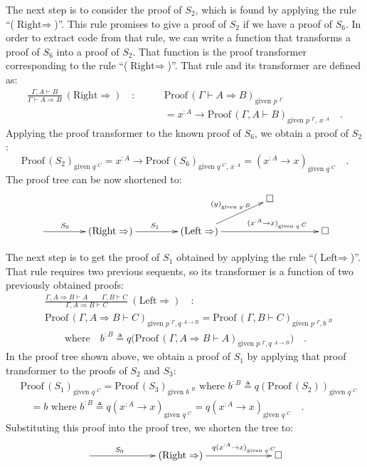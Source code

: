The next step is to consider the proof of $S_{2}$, which is found
by applying the rule \textsf{``}($\text{Right}\Rightarrow$)\textsf{''}. This rule
promises to give a proof of $S_{2}$ if we have a proof of $S_{6}$.
In order to extract code from that rule, we can write a function that
transforms a proof of $S_{6}$ into a proof of $S_{2}$. That function
is the proof transformer corresponding to the rule \textsf{``}($\text{Right}\Rightarrow$)\textsf{''}.
That rule and its transformer are defined as:
\begin{align*}
\frac{\Gamma,A\vdash B}{\Gamma\vdash A\Rightarrow B}~(\text{Right}\Rightarrow)\quad: & \quad\quad\text{Proof}\,(\Gamma\vdash A\Rightarrow B)_{\text{given }p^{:\Gamma}}\\
 & \quad\quad=x^{:A}\rightarrow\text{Proof}\,(\Gamma,A\vdash B)_{\text{given }p^{:\Gamma},\,x^{:A}}\quad.
\end{align*}
Applying the proof transformer to the known proof of $S_{6}$, we
obtain a proof of $S_{2}$:
\[
\text{Proof}\,(S_{2})_{\text{given }q^{:C}}=x^{:A}\rightarrow\text{Proof}\,(S_{6})_{\text{given }q^{:C},\,x^{:A}}=(x^{:A}\rightarrow x)_{\text{given }q^{:C}}\quad.
\]
The proof tree can be now shortened to:
\[
\xymatrix{\xyScaleY{1.5pc}\xyScaleX{3.5pc} &  &  & \square\\
\ar[r]\sp(0.35){S_{0}} & (\text{Right}\Rightarrow)\ar[r]\sp(0.5){S_{1}} & (\text{Left}\Rightarrow)\ar[rr]\sp(0.62){(x^{:A}\rightarrow x)_{\text{given }q^{:C}}}\ar[ru]\sp(0.6){(y)_{\text{given }y^{:B}}} &  & \square
}
\]

The next step is to get the proof of $S_{1}$ obtained by applying
the rule \textsf{``}($\text{Left}\Rightarrow$)\textsf{''}. That rule requires two
previous sequents, so its transformer is a function of two previously
obtained proofs:
\begin{align*}
 & \frac{\Gamma,A\Rightarrow B\vdash A\quad\quad\Gamma,B\vdash C}{\Gamma,A\Rightarrow B\vdash C}~(\text{Left}\Rightarrow)\quad:\\
 & \text{Proof}\,(\Gamma,A\Rightarrow B\vdash C)_{\text{given }p^{:\Gamma},q^{:A\rightarrow B}}=\text{Proof}\,(\Gamma,B\vdash C)_{\text{given }p^{:\Gamma},b^{:B}}\\
 & \quad\quad\text{where}\quad b^{:B}\triangleq q\big(\text{Proof}\,(\Gamma,A\Rightarrow B\vdash A)_{\text{given }p^{:\Gamma},q^{:A\rightarrow B}}\big)\quad.
\end{align*}
In the proof tree shown above, we obtain a proof of $S_{1}$ by applying
that proof transformer to the proofs of $S_{2}$ and $S_{3}$:
\begin{align*}
 & \text{Proof}\,(S_{1})_{\text{given }q^{:C}}=\text{Proof}\,(S_{3})_{\text{given }b^{:B}}\text{ where }b^{:B}\triangleq q(\text{Proof}\,(S_{2}))_{\text{given }q^{:C}}\\
 & \quad=b\text{ where }b^{:B}\triangleq q(x^{:A}\rightarrow x)_{\text{given }q^{:C}}=q(x^{:A}\rightarrow x)_{\text{given }q^{:C}}\quad.
\end{align*}
Substituting this proof into the proof tree, we shorten the tree to:
\[
\xymatrix{\xyScaleY{1.5pc}\xyScaleX{5.5pc}\ar[r]\sp(0.35){S_{0}} & (\text{Right}\Rightarrow)\ar[r]\sp(0.65){q(x^{:A}\rightarrow x)_{\text{given }q^{:C}}} & \square}
\]

